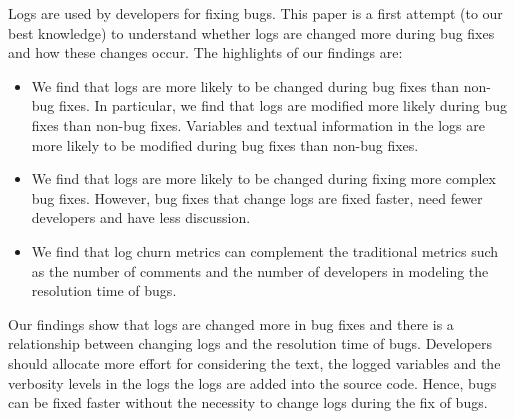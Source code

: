 Logs are used by developers for fixing bugs. This paper is a first attempt (to our best knowledge) to understand whether logs are changed more during bug fixes and how these changes occur. The highlights of our findings are:

\begin{itemize}
	\item We find that logs are more likely to be changed during bug fixes than non-bug fixes. In particular, we find that logs are modified more likely during bug fixes than non-bug fixes. Variables and textual information in the logs are more likely to be modified during bug fixes than non-bug fixes. 
	\item We find that logs are more likely to be changed during fixing more complex bug fixes. However, bug fixes that change logs are fixed faster, need fewer developers and have less discussion.
	\item We find that log churn metrics can complement the traditional metrics such as the number of comments and the number of developers in modeling the resolution time of bugs. 
\end{itemize} 

Our findings show that logs are changed more in bug fixes and there is a relationship between changing logs and the resolution time of bugs. Developers should allocate more effort for considering the text, the logged variables and the verbosity levels in the logs the logs are added into the source code. Hence, bugs can be fixed faster without the necessity to change logs during the fix of bugs. 
